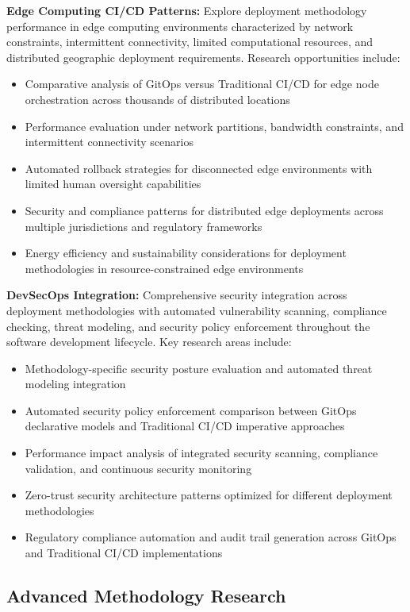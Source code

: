 \textbf{Edge Computing CI/CD Patterns:} Explore deployment methodology performance in edge computing environments characterized by network constraints, intermittent connectivity, limited computational resources, and distributed geographic deployment requirements. Research opportunities include:
\begin{itemize}
\item Comparative analysis of GitOps versus Traditional CI/CD for edge node orchestration across thousands of distributed locations
\item Performance evaluation under network partitions, bandwidth constraints, and intermittent connectivity scenarios
\item Automated rollback strategies for disconnected edge environments with limited human oversight capabilities
\item Security and compliance patterns for distributed edge deployments across multiple jurisdictions and regulatory frameworks
\item Energy efficiency and sustainability considerations for deployment methodologies in resource-constrained edge environments
\end{itemize}

\textbf{DevSecOps Integration:} Comprehensive security integration across deployment methodologies with automated vulnerability scanning, compliance checking, threat modeling, and security policy enforcement throughout the software development lifecycle. Key research areas include:
\begin{itemize}
\item Methodology-specific security posture evaluation and automated threat modeling integration
\item Automated security policy enforcement comparison between GitOps declarative models and Traditional CI/CD imperative approaches
\item Performance impact analysis of integrated security scanning, compliance validation, and continuous security monitoring
\item Zero-trust security architecture patterns optimized for different deployment methodologies
\item Regulatory compliance automation and audit trail generation across GitOps and Traditional CI/CD implementations
\end{itemize}

\subsection{Advanced Methodology Research}
\label{subsec:advanced_methodology}

